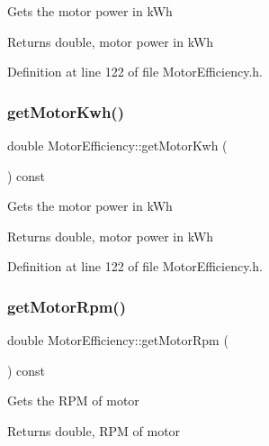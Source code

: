 Gets the motor power in k\+Wh \begin{DoxyReturn}{Returns}
double, motor power in k\+Wh 
\end{DoxyReturn}


Definition at line 122 of file Motor\+Efficiency.\+h.

\mbox{\label{class_motor_efficiency_a4d21d0c44ee00f5d097b0acbcb73a8d8}} 
\subsubsection{\texorpdfstring{get\+Motor\+Kwh()}{getMotorKwh()}\hspace{0.1cm}{\footnotesize\ttfamily [3/3]}}
{\footnotesize\ttfamily double Motor\+Efficiency\+::get\+Motor\+Kwh (\begin{DoxyParamCaption}{ }\end{DoxyParamCaption}) const\hspace{0.3cm}{\ttfamily [inline]}}

Gets the motor power in k\+Wh \begin{DoxyReturn}{Returns}
double, motor power in k\+Wh 
\end{DoxyReturn}


Definition at line 122 of file Motor\+Efficiency.\+h.

\mbox{\label{class_motor_efficiency_ab29655f487e90a73246be6e9bc67c36a}} 
\subsubsection{\texorpdfstring{get\+Motor\+Rpm()}{getMotorRpm()}\hspace{0.1cm}{\footnotesize\ttfamily [1/3]}}
{\footnotesize\ttfamily double Motor\+Efficiency\+::get\+Motor\+Rpm (\begin{DoxyParamCaption}{ }\end{DoxyParamCaption}) const\hspace{0.3cm}{\ttfamily [inline]}}

Gets the R\+PM of motor \begin{DoxyReturn}{Returns}
double, R\+PM of motor 
\end{DoxyReturn}


